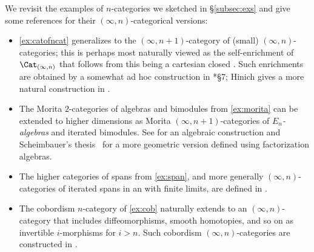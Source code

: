 \documentclass[a4paper,12pt]{article}
\begin{document}
\begin{remark}\label{rmk:exs}
  We revisit the examples of $n$-categories we sketched in
  \S\ref{subsec:exs} and give some references for their
  $(\infty,n)$-categorical versions:
  \begin{itemize}
  \item \cref{ex:catofncat} generalizes to the $(\infty,n+1)$-category
    of (small) $(\infty,n)$-categories; this is perhaps most naturally
    viewed as the self-enrichment of $\Cat_{(\infty,n)}$ that follows
    from this being a cartesian closed \icat{}. Such enrichments are
    obtained by a somewhat ad hoc construction in \cite{enr}*{\S 7};
    Hinich gives a more natural construction in \cite{HinichYoneda}.
  \item The Morita $2$-categories of algebras and bimodules from
    \cref{ex:morita} can be extended to higher dimensions as Morita
    $(\infty,n+1)$-categories of \emph{$E_{n}$-algebras} and iterated
    bimodules. See \cite{nmorita} for an algebraic construction and
    Scheimbauer's thesis~\cite{ScheimbauerThesis} for a more geometric
    version defined using factorization algebras.
  \item The higher categories of spans from \cref{ex:span}, and more
    generally $(\infty,n)$-categories of iterated spans
    in an \icat{} with finite limits, are defined in \cite{spans}.
  \item The cobordism $n$-category of \cref{ex:cob} naturally extends
    to an $(\infty,n)$-category that includes diffeomorphisms, smooth
    homotopies, and so on as invertible $i$-morphisms for $i >
    n$. Such cobordism $(\infty,n)$-categories are constructed in
    \cite{CSBord}.
  \end{itemize}
\end{remark}
\end{document}
